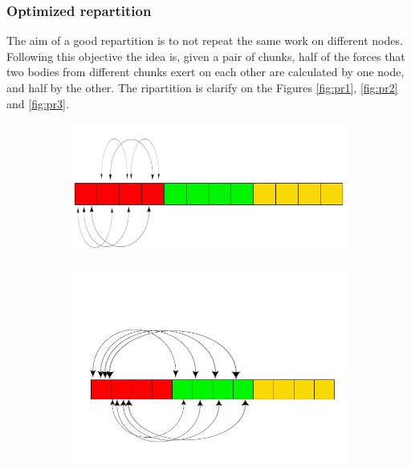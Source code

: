 \documentclass[a4paper]{article}
\begin{document}
\subsubsection{Optimized repartition}
\label{sec:opt_rep}
The aim of a good repartition is to not repeat the same work on different nodes. Following this objective the idea is, given a pair of chunks, half of the forces that two bodies from different chunks exert on each other are calculated by one node, and half by the other. The ripartition is clarify on the Figures \ref{fig:pr1}, \ref{fig:pr2} and \ref{fig:pr3}.


\begin{figure}[ht]
\centering
\begin{subfigure}{.35\textwidth}
  \centering
  \includegraphics[width=1\linewidth]{array_proc_0_b_0}
\end{subfigure}%
\begin{subfigure}{.35\textwidth}
  \centering
  \includegraphics[width=1\linewidth]{array_proc_0_b_1}
\end{subfigure}\\ %

\end{figure}
\end{document}
